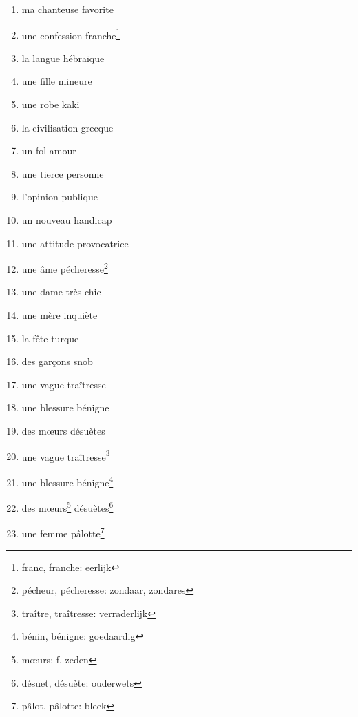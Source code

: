 \documentclass[11pt, french]{report}
\begin{document}
\vfill

\begin{enumerate}
\item ma chanteuse favorite
\item une confession franche\footnote{franc, franche: eerlijk}
\item la langue hébraïque
\item une fille mineure
\item une robe kaki
\item la civilisation grecque
\item un fol amour
\item une tierce personne
\item l'opinion publique
\item un nouveau handicap
\item une attitude provocatrice
\item une âme pécheresse\footnote{pécheur, pécheresse: zondaar, zondares}
\item une dame très chic
\item une mère inquiète
\item la fête turque
\item des garçons snob
\item une vague traîtresse
\item une blessure bénigne
\item des mœurs désuètes
\item une vague traîtresse\footnote{traître, traîtresse: verraderlijk}
\item une blessure bénigne\footnote{bénin, bénigne: goedaardig}
\item des mœurs\footnote{mœurs: f, zeden} désuètes\footnote{désuet, désuète: ouderwets}
\item une femme pâlotte\footnote{pâlot, pâlotte: bleek}
\end{enumerate}

\vfill
\end{document}

